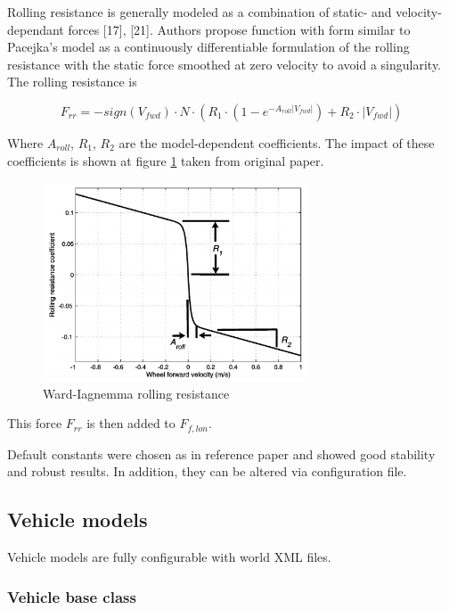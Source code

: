 \documentclass[a4paper,11pt]{article}
\begin{document}
Rolling resistance is generally modeled as a combination of
static- and velocity-dependant forces [17], [21]. Authors propose function with form similar to Pacejka's model \cite{pacejka_tire_model} as a continuously differentiable
formulation of the rolling resistance with the static force
smoothed at zero velocity to avoid a singularity. The rolling
resistance is


$$
F_{rr} = −sign(V_{fwd}) \cdot N \cdot (R_1 \cdot (1 − e^{−A_{roll} |V_{fwd} |}
)+R_2 \cdot |V_{fwd}|)
$$


Where $A_{roll}$, $R_1$, $R_2$ are the model-dependent coefficients. The impact of these coefficients is shown at figure \ref{fig:wi_rr} taken from original paper.

\begin{figure}[h!]
	\centerline{\includegraphics[width = 0.7\textwidth]{imgs/wi_rr}}	
	\caption{Ward-Iagnemma rolling resistance}
	\label{fig:wi_rr}
\end{figure}

This force $F_{rr}$ is then added to $F_{f,lon}$.

Default constants were chosen as in reference paper and showed good stability and robust results. In addition, they can be altered via configuration file. 



\newpage


\subsection{Vehicle models}

Vehicle models are fully configurable with world XML files. 

\subsubsection{Vehicle base class}
\end{document}
